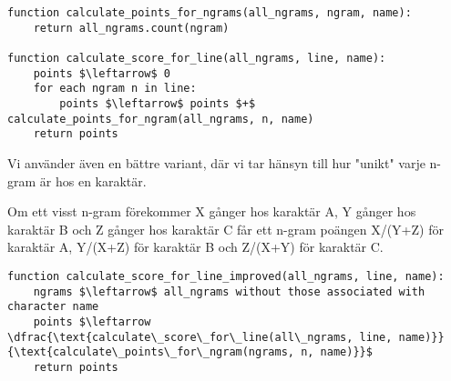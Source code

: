 \documentclass[a4paper]{article}
\begin{document}
\begin{lstlisting}[mathescape, columns=fullflexible, basicstyle=\fontfamily{lmvtt}\selectfont]
function calculate_points_for_ngrams(all_ngrams, ngram, name):
    return all_ngrams.count(ngram)

function calculate_score_for_line(all_ngrams, line, name):
    points $\leftarrow$ 0
    for each ngram n in line:
        points $\leftarrow$ points $+$ calculate_points_for_ngram(all_ngrams, n, name)
    return points
\end{lstlisting}

Vi använder även en bättre variant, där vi tar hänsyn till hur "unikt"
varje n-gram är hos en karaktär.

Om ett visst n-gram förekommer X gånger hos karaktär A, Y gånger hos
karaktär B och Z gånger hos karaktär C får ett n-gram poängen X/(Y+Z)
för karaktär A, Y/(X+Z) för karaktär B och Z/(X+Y) för karaktär C.

\begin{lstlisting}[mathescape, columns=fullflexible, basicstyle=\fontfamily{lmvtt}\selectfont]
function calculate_score_for_line_improved(all_ngrams, line, name):
    ngrams $\leftarrow$ all_ngrams without those associated with character name 
    points $\leftarrow  \dfrac{\text{calculate\_score\_for\_line(all\_ngrams, line, name)}}{\text{calculate\_points\_for\_ngram(ngrams, n, name)}}$
    return points
\end{lstlisting}
\end{document}

